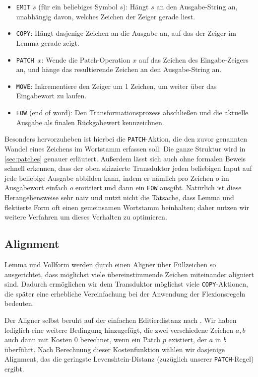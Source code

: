 \documentclass[11pt,a4paper]{article}
\newcommand{\action}[1]{\texttt{#1}}
\begin{document}
\begin{itemize}
    \item \action{EMIT} $s$ (für ein beliebiges Symbol $s$): Hängt $s$ an den Ausgabe-String an, unabhängig davon, welches Zeichen der Zeiger gerade liest.
    \item \action{COPY}: Hängt dasjenige Zeichen an die Ausgabe an, auf das der Zeiger im Lemma gerade zeigt.
    \item \action{PATCH $x$}: Wende die Patch-Operation $x$ auf das Zeichen des Eingabe-Zeigers an, und hänge das resultierende Zeichen an den Ausgabe-String an.
    \item \action{MOVE}: Inkrementiere den Zeiger um 1 Zeichen, um weiter über das Eingabewort zu laufen.
    \item \action{EOW} (\underline{e}nd \underline{o}f \underline{w}ord): Den Transformationsprozess abschließen und die aktuelle Ausgabe als finalen Rückgabewert kennzeichnen.
\end{itemize}

Besonders hervorzuheben ist hierbei die \action{PATCH}-Aktion, die den zuvor genannten Wandel eines Zeichens im Wortstamm erfassen soll. Die ganze Struktur wird in \autoref{sec:patches} genauer erläutert.
Außerdem lässt sich auch ohne formalen Beweis schnell erkennen, dass der oben skizzierte Transduktor jeden beliebigen Input auf jede beliebige Ausgabe abbilden kann, indem er nämlich pro Zeichen $o$ im Ausgabewort einfach $o$ emittiert und dann ein \action{EOW} ausgibt. Natürlich ist diese Herangehensweise sehr naiv und nutzt nicht die Tatsache, dass Lemma und flektierte Form oft einen gemeinsamen Wortstamm beinhalten; daher nutzen wir weitere Verfahren um dieses Verhalten zu optimieren.

\subsection{Alignment}
\label{sec:alignment}
Lemma und Vollform werden durch einen Aligner über Füllzeichen so ausgerichtet, dass möglichst viele übereinstimmende Zeichen miteinander aligniert sind. Dadurch ermöglichen wir dem Transduktor möglichst viele \action{COPY}-Aktionen, die später eine erhebliche Vereinfachung bei der Anwendung der Flexionsregeln bedeuten.

Der Aligner selbst beruht auf der einfachen Editierdistanz nach \citet{levenshtein:binary66}. Wir haben lediglich eine weitere Bedingung hinzugefügt, die zwei verschiedene Zeichen $a, b$ auch dann mit Kosten $0$ berechnet, wenn ein Patch $p$ existiert, der $a$ in $b$ überführt. Nach Berechnung dieser Kostenfunktion wählen wir dasjenige Alignment, das die geringste Levenshtein-Distanz (zuzüglich unserer \action{PATCH}-Regel) ergibt.
\end{document}
